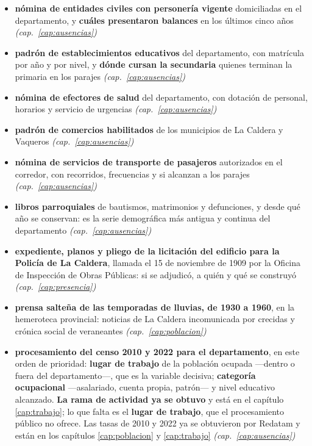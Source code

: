 \begin{itemize}
\item \textbf{nómina de entidades civiles con personería vigente} domiciliadas en el departamento, y \textbf{cuáles presentaron balances} en los últimos cinco años \textit{(cap.\ \ref{cap:ausencias})}
\item \textbf{padrón de establecimientos educativos} del departamento, con matrícula por año y por nivel, y \textbf{dónde cursan la secundaria} quienes terminan la primaria en los parajes \textit{(cap.\ \ref{cap:ausencias})}
\item \textbf{nómina de efectores de salud} del departamento, con dotación de personal, horarios y servicio de urgencias \textit{(cap.\ \ref{cap:ausencias})}
\item \textbf{padrón de comercios habilitados} de los municipios de La Caldera y Vaqueros \textit{(cap.\ \ref{cap:ausencias})}
\item \textbf{nómina de servicios de transporte de pasajeros} autorizados en el corredor, con recorridos, frecuencias y si alcanzan a los parajes \textit{(cap.\ \ref{cap:ausencias})}
\item \textbf{libros parroquiales} de bautismos, matrimonios y defunciones, y desde qué año se conservan: es la serie demográfica más antigua y continua del departamento \textit{(cap.\ \ref{cap:ausencias})}
\item \textbf{expediente, planos y pliego de la licitación del edificio para la Policía de La Caldera}, llamada el 15 de noviembre de 1909 por la Oficina de Inspección de Obras Públicas: si se adjudicó, a quién y qué se construyó \textit{(cap.\ \ref{cap:presencia})}
\item \textbf{prensa salteña de las temporadas de lluvias, de 1930 a 1960}, en la hemeroteca provincial: noticias de La Caldera incomunicada por crecidas y crónica social de veraneantes \textit{(cap.\ \ref{cap:poblacion})}
\item \textbf{procesamiento del censo 2010 y 2022 para el departamento}, en este orden de prioridad: \textbf{lugar de trabajo} de la población ocupada ---dentro o fuera del departamento---, que es la variable decisiva; \textbf{categoría ocupacional} ---asalariado, cuenta propia, patrón--- y nivel educativo alcanzado. \textbf{La rama de actividad ya se obtuvo} y está en el capítulo \ref{cap:trabajo}; lo que falta es el \textbf{lugar de trabajo}, que el procesamiento público no ofrece. Las tasas de 2010 y 2022 ya se obtuvieron por Redatam y están en los capítulos \ref{cap:poblacion} y \ref{cap:trabajo} \textit{(cap.\ \ref{cap:ausencias})}

\end{itemize}
